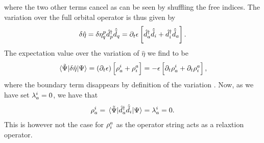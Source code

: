             where the two other terms cancel as can be seen by shuffling the
            free indices.
            The variation over the full orbital operator is thus given by
            \begin{align}
                \delta\hat{\eta}
                = \delta\eta^{p}_{q}\hat{d}^{\dagger}_{p}\hat{\tilde{d}}_{q}
                = \partial_t\epsilon\left[ 
                    \hat{d}^{\dagger}_{a}\hat{\tilde{d}}_{i}
                    + \hat{d}^{\dagger}_{i}\hat{\tilde{d}}_{a}
                 \right].
            \end{align}
            The expectation value over the variation of $\hat{\eta}$ we find to
            be
            \begin{align}
                \mel*{\tilde{\Psi}}{\delta\hat{\eta}}{\Psi}
                = \left( \partial_t\epsilon \right)
                \left[ 
                    \rho^{i}_{a}
                    + \rho^{a}_{i}
                 \right]
                =
                -\epsilon\left[ 
                    \partial_t\rho^{i}_{a}
                    + \partial_t\rho^{a}_{i}
                 \right],
            \end{align}
            where the boundary term disappears by definition of the variation
            \cite{kvaal2012ab}.
            Now, as we have set $\lambda^{i}_{a} = 0$, we have that
            \begin{align}
                \rho^{i}_{a}
                = \mel*{\tilde{\Psi}}{\hat{d}^{\dagger}_{a}\hat{\tilde{d}}_{i}}{\Psi}
                = \lambda^{i}_{a}
                = 0.
            \end{align}
            This is however not the case for $\rho^{a}_{i}$ as the
            operator string acts as a relaxtion operator.


